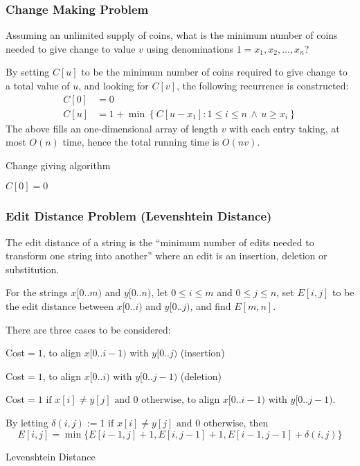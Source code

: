 \documentclass[10pt]{article}
\begin{document}
\subsubsection{Change Making Problem}
Assuming an unlimited supply of coins, what is the minimum number of coins needed to give change to value $v$ using denominations $1=x_1,x_2,\ldots,x_n$?

By setting $C[u]$ to be the minimum number of coins required to give change to a total value of $u$, and looking for $C[v]$, the following recurrence is constructed:
\begin{align*}
C[0] &=0\\
C[u] &= 1+\min\left\{C[u-x_1]:1\le i\le n\,\wedge\, u\ge x_i\right\}
\end{align*}
The above fills an one-dimensional array of length $v$ with each entry taking, at most $O(n)$ time, hence the total running time is $O(nv)$.
\begin{algorithm}
\caption{Change giving algorithm}
$C[0]=0$\;
\;
\end{algorithm}
\subsubsection{Edit Distance Problem (Levenshtein Distance)}
The edit distance of a string is the ``minimum number of edits needed to transform one string into another'' where an edit is an insertion, deletion or substitution.

For the strings $x[0..m)$ and $y[0..n)$, let $0\le i\le m$ and $0\le j \le n$, set $E[i,j]$ to be the edit distance between $x[0..i)$ and $y[0..j)$, and find $E[m,n]$.

There are three cases to be considered:
\begin{enumerate*}
\item Cost$=1$, to align $x[0..i-1)$ with $y[0..j)$ (insertion)
\item Cost$=1$, to align $x[0..i)$ with $y[0..j-1)$ (deletion)
\item Cost$=1\text{ if }x[i]\neq y[j]\text{ and }0\text{ otherwise}$, to align $x[0..i-1)$ with $y[0..j-1)$.
\end{enumerate*}
By letting $\delta(i,j):=1\text{ if }x[i]\neq y[j]\text{ and }0\text{ otherwise}$, then
\[E[i,j]=\min\{E[i-1,j]+1, E[i,j-1]+1,E[i-1,j-1]+\delta(i,j)\}\]
\begin{algorithm}
\caption{Levenshtein Distance}
\KwIn{Strings $x[0..m)$ and $y[0..n)$}
\;
\end{algorithm}
\end{document}
